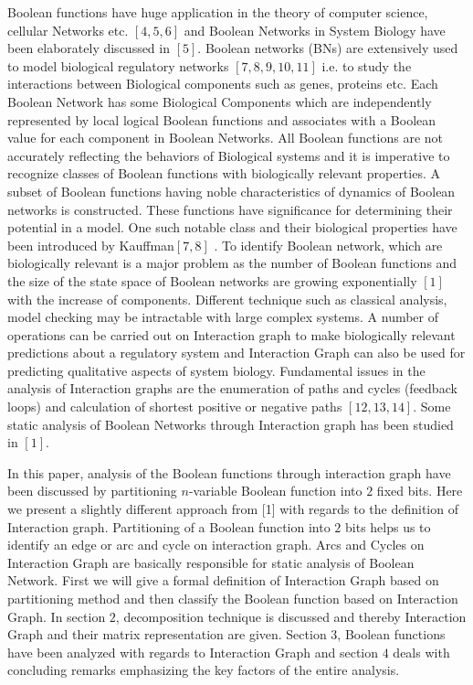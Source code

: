 \documentclass{article}
\begin{document}
Boolean functions have huge application in the theory of computer science, cellular Networks etc. $[4, 5, 6]$ and Boolean Networks in System Biology have been elaborately discussed in $[5]$. Boolean networks (BNs) are extensively used to model biological regulatory networks $[7, 8, 9, 10, 11]$ i.e. to study the interactions between Biological components such as genes, proteins etc. Each Boolean Network has some Biological Components which are independently represented by local logical Boolean functions and associates with a Boolean value for each component in Boolean Networks. All Boolean functions are not accurately reflecting the behaviors of Biological systems and it is imperative to recognize classes of Boolean functions with biologically relevant properties. A subset of Boolean functions having noble characteristics of dynamics of Boolean networks is constructed. These functions have significance for determining their potential in a model. One such notable class and their biological properties have been introduced by Kauffman$[7, 8]$ . To identify Boolean network, which are biologically relevant is a major problem as the number of Boolean functions and the size of the state space of Boolean networks are growing exponentially $[1]$ with the increase of components. Different technique such as classical analysis, model checking may be intractable with large complex systems. A number of operations can be carried out on Interaction graph to make biologically relevant predictions about a regulatory system and Interaction Graph can also be used for predicting qualitative aspects of system biology. Fundamental issues in the analysis of Interaction graphs are the enumeration of paths and cycles (feedback loops) and calculation of shortest positive or negative paths $[12, 13, 14]$.  Some static analysis of Boolean Networks through Interaction graph has been studied in $[1]$.

In this paper, analysis of the Boolean functions through interaction graph have been discussed by partitioning $n$-variable Boolean function into $2$ fixed bits. Here we present a slightly different approach from [1] with regards to the definition of Interaction graph.  Partitioning of a Boolean function into $2$ bits helps us to identify an edge or arc and cycle on interaction graph. Arcs and Cycles on Interaction Graph are basically responsible for static analysis of Boolean Network. First we will give a formal definition of Interaction Graph based on partitioning method and then classify the Boolean function based on Interaction Graph. In section $2$, decomposition technique is discussed and thereby Interaction Graph and their matrix representation are given. Section $3$, Boolean functions have been analyzed with regards to Interaction Graph and section $4$ deals with concluding remarks emphasizing the key factors of the entire analysis.
\end{document}
